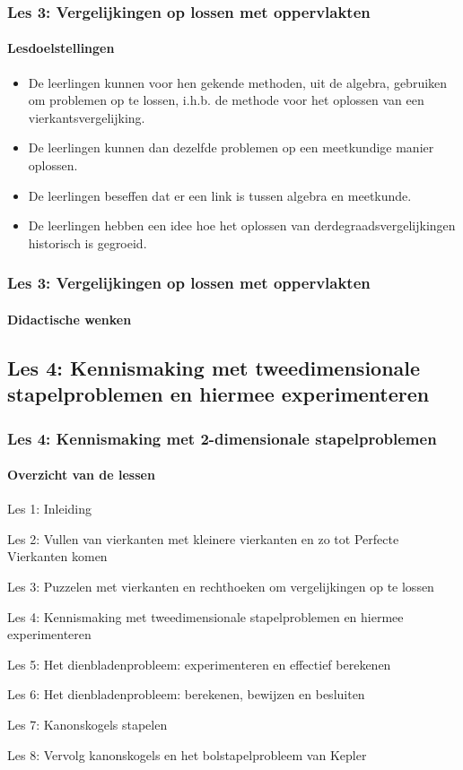 \documentclass[dutch]{beamer}
\begin{document}
\begin{frame}
\frametitle{Les 3: Vergelijkingen op lossen met oppervlakten}
\framesubtitle{Lesdoelstellingen}
\begin{itemize}
  \item De leerlingen kunnen voor hen gekende methoden, uit de algebra, gebruiken om problemen op te lossen, i.h.b. de methode voor het oplossen van een vierkantsvergelijking.
  \item De leerlingen kunnen dan dezelfde problemen op een meetkundige manier oplossen.
  \item De leerlingen beseffen dat er een link is tussen algebra en meetkunde.
  \item De leerlingen hebben een idee hoe het oplossen van derdegraadsvergelijkingen historisch is gegroeid.
\end{itemize}
\end{frame}

\begin{frame}
\frametitle{Les 3: Vergelijkingen op lossen met oppervlakten}
\framesubtitle{Didactische wenken}

\end{frame}

\subsection{Les 4: Kennismaking met tweedimensionale stapelproblemen en hiermee experimenteren}
\begin{frame}
\frametitle{Les 4: Kennismaking met 2-dimensionale stapelproblemen}
\framesubtitle{Overzicht van de lessen}
\begin{list}{\quad}{}
\item Les 1: Inleiding
\item Les 2: Vullen van vierkanten met kleinere vierkanten en zo tot Perfecte Vierkanten komen
\item Les 3: Puzzelen met vierkanten en rechthoeken om vergelijkingen op te lossen
\item {\color{blue}Les 4: Kennismaking met tweedimensionale stapelproblemen en hiermee experimenteren}
\item Les 5: Het dienbladenprobleem: experimenteren en effectief berekenen
\item Les 6: Het dienbladenprobleem: berekenen, bewijzen en besluiten
\item Les 7: Kanonskogels stapelen
\item Les 8: Vervolg kanonskogels en het bolstapelprobleem van Kepler
\end{list}
\end{frame}
\end{document}
